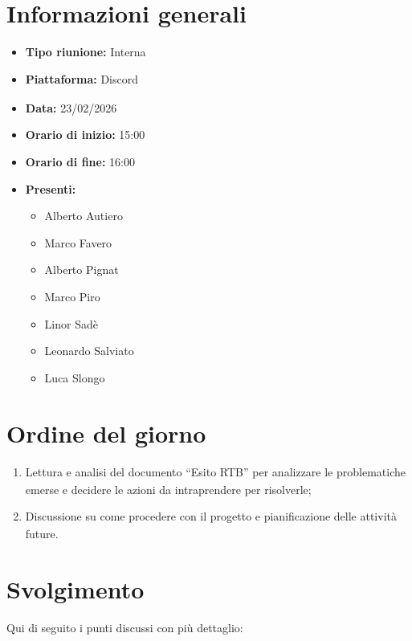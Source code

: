 \documentclass[a4paper,12pt]{article}
\begin{document}
\newpage

\tableofcontents
\newpage

\section{Informazioni generali}

\begin{itemize}
    \item \textbf{Tipo riunione:} Interna
    \item \textbf{Piattaforma:} Discord\textsubscript{}
    \item \textbf{Data:} 23/02/2026
    \item \textbf{Orario di inizio:} 15:00
    \item \textbf{Orario di fine:} 16:00
    \item \textbf{Presenti:}
    \begin{itemize}[leftmargin=1.5em, itemsep=3pt, label={\rule[0.5ex]{0.4em}{0.4em}}]
        \item Alberto Autiero
        \item Marco Favero
        \item Alberto Pignat
        \item Marco Piro
        \item Linor Sadè
        \item Leonardo Salviato
        \item Luca Slongo
    \end{itemize}
\end{itemize}

\section{Ordine del giorno}
\begin{enumerate}
    \item\label{itm:revisione_doc} Lettura e analisi del documento ``Esito RTB\textsubscript{}'' per analizzare le problematiche emerse e decidere le 
    azioni da intraprendere per risolverle;
    \item\label{itm:decisioni_future} Discussione su come procedere con il progetto\textsubscript{} e pianificazione delle attività future.
\end{enumerate}


\newpage
\section{Svolgimento}
Qui di seguito i punti discussi con più dettaglio:
\end{document}
